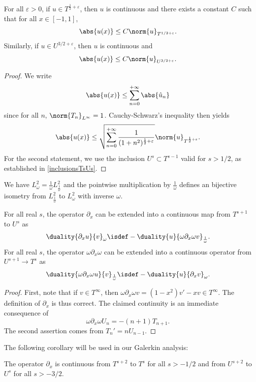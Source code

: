 \documentclass[a4paper]{article}
\begin{document}
	\begin{Lem}
		\label{LemInjectionsContinues}
		For all $\varepsilon >0$, if $u \in T^{\frac{1}{2} + \varepsilon}$, then $u$ is continuous and there exists a constant $C$ such that for all $x \in [-1,1]$,
		\[ \abs{u(x)} \leq C \norm{u}_{T^{1/2 + \varepsilon}}.\]	
		Similarly, if $u \in U^{3/2 + \varepsilon}$, then $u$ is continuous and 
		\[ \abs{u(x)} \leq C \norm{u}_{U^{3/2 + \varepsilon}}.\]
		\begin{proof}
			We write 
			\[\abs{u(x)} \leq \sum_{n = 0}^{+ \infty} \abs{\hat{u}_n}\]
			since for all $n$, $\norm{T_n}_{L^\infty} = 1$. Cauchy-Schwarz's inequality then yields
			\[\abs{u(x)} \leq \sqrt{\sum_{n= 0}^{+ \infty} \frac{1}{(1+ n^2)^{\frac{1}{2}+ \varepsilon}}} \norm{u}_{T^{\frac{1}{2} + \varepsilon}}.\]
			For the second statement, we use the inclusion $U^{s} \subset T^{s-1}$ valid for $s > 1/2$, as established in \autoref{inclusionsTsUs}. 
		\end{proof}	
	\end{Lem}
	\begin{Lem}
		We have $L^2_\omega = \frac{1}{\omega}L^2_\frac{1}{\omega}$ and the pointwise multiplication by $\frac{1}{\omega}$ defines an bijective isometry from $L^2_\frac{1}{\omega}$ to $L^2_\omega$ with inverse $\omega$. 
		\label{isometrie}
	\end{Lem}
	\begin{Lem}
		For all real $s$, the operator $\partial_x$ can be extended into a continuous map from $T^{s+1}$ to $U^{s}$ as
		\[ \duality{\partial_x u}{v}_{\omega} \isdef -\duality{u}{\omega \partial_x \omega v}_{\frac{1}{\omega}}.\] 
		For all real $s$, the  operator $\omega \partial_x \omega$ can be extended into a continuous operator from $U^{s+1} \to T^{s}$ as
		\[\duality{\omega \partial_x \omega u}{v}_\frac{1}{\omega} \isdef -\duality{u}{\partial_x v}_\omega.\]
		\begin{proof}
			First, note that if $v \in T^{\infty}$, then  $\omega \partial_x \omega v = (1-x^2)v' - xv \in T^{\infty}$. The definition of $\partial_x$ is thus correct. The claimed continuity  is an immediate consequence of 
			\[\omega \partial_x \omega U_n = -(n+1) T_{n+1}.\]
			The second assertion comes from $T_n' = nU_{n-1}$. 
		\end{proof}
	\end{Lem}
	\noindent The following corollary will be used in our Galerkin analysis:
	\begin{Cor}
		\label{corDxT2T0}
		The operator $\partial_x$ is continuous from $T^{s+2}$ to $T^s$ for all $s > -1/2 $ and from $U^{s+2}$ to $U^s$ for all $s > - 3/2$.
	\end{Cor}
\end{document}
